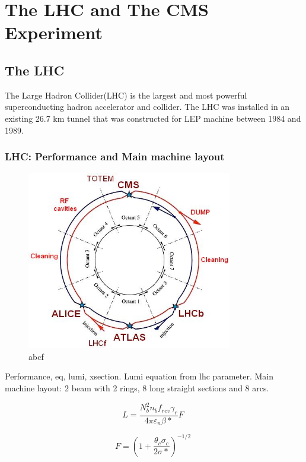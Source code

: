 \chapter{The LHC and The CMS Experiment}

\section{The LHC}
The Large Hadron Collider(LHC) is the largest and most powerful superconducting hadron accelerator and collider. The LHC was installed in an existing 26.7 km tunnel that was constructed for LEP machine between 1984 and 1989. 
\subsection{LHC: Performance and Main machine layout}

\begin{figure}[htbp]
 \begin{center}
  \includegraphics[width=0.8\textwidth]{figures/c3/c3_lhc_latticelayout.jpg}
 \end{center}
 \caption{abcf}
 \label{fig:c3lhclayout}
\end{figure}

Performance, eq, lumi, xsection. Lumi equation from lhc parameter.
Main machine layout: 2 beam with 2 rings, 8 long straight sections and 8 arcs.

\begin{equation}
 L = \frac{N^{2}_{b}n_{b}f_{rev}\gamma_{r}}{4\pi \varepsilon_{n}\beta *}F \;
 \label{eq:c3lhclumi}
\end{equation}

\begin{equation}
 F = (1+\frac{\theta_{c}\sigma_{c}}{2\sigma *})^{-1/2} \;
 \label{eq:c3lhcgeof}
\end{equation}

